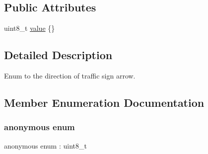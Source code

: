 \subsection*{Public Attributes}
\begin{DoxyCompactItemize}
\item 
uint8\+\_\+t \hyperlink{structmaf__perception__interface_1_1TrafficSignArrowDirectionEnum_ab900ca03ddc08cd93da457f59c6d96aa}{value} \{\}
\end{DoxyCompactItemize}


\subsection{Detailed Description}
Enum to the direction of traffic sign arrow. 

\subsection{Member Enumeration Documentation}
\mbox{\label{structmaf__perception__interface_1_1TrafficSignArrowDirectionEnum_a8d3a3c1beed99fc90ae6618f18f1d175}} 
\subsubsection{\texorpdfstring{anonymous enum}{anonymous enum}}
{\footnotesize\ttfamily anonymous enum \+: uint8\+\_\+t}

